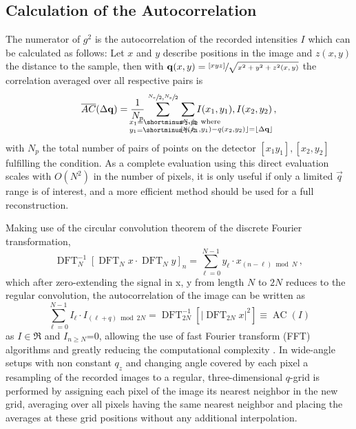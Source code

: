\subsection{Calculation of the Autocorrelation}
\label{sec:corr}
The numerator of $g^2$ is the autocorrelation of the recorded intensities $I$ which can be calculated as follows:
Let $x$ and $y$ describe positions in the image and $z(x,y)$ the distance to the sample, then 
with $\mathbf{q}(x,y) = \sfrac{[x y z]}{\sqrt{x ^ 2 + y ^ 2 + z^2(x,y)}}$  the correlation averaged over all respective pairs is
\begin{equation}
	\overline{AC}(\Delta \vec{q}) = 
	\frac{1}{N_p} \quad \sum^{	\crampedclap{\sfrac{N_x}{2},\sfrac{N_y}{2}}}_{
		\crampedclap{
			\begin{subarray}{l}
				x_1=\shortminus\sfrac{N_x}{2}\\
				y_1=\shortminus\sfrac{N_y}{2}
			\end{subarray}
	}}\quad
	\sum_{\crampedclap{\qquad\qquad\qquad\qquad
			\begin{subarray}{l}
				x_2,y_2 \text{ where} \\ \lfloor q(x_1,y_1)-q(x_2,y_2)\rfloor=\lfloor\Delta\vec{q}\rfloor
	\end{subarray}}}
	I(x_1,y_1),I(x_2,y_2) \,,
	\label{eq:correlation}
\end{equation}
with $N_p$ the total number of pairs of points on the detector $[x_1 y_1],[x_2,y_2]$  fulfilling the condition. As a complete evaluation using this direct evaluation scales with $O(N^2)$ in the number of pixels, it is only useful if only a limited $\vec{q}$ range is of interest, and a more efficient method should be used for a full reconstruction.

Making use of the circular convolution theorem of the discrete Fourier transformation,
\begin{equation}
	\operatorname{DFT}_N^{-1}\left[\operatorname{DFT}_N x \cdot \operatorname{DFT}_N y\right]_n=\sum_{\ell=0}^{N-1} y_{\ell} \cdot x_{(n-\ell) \bmod N} \,,
\end{equation}
which after zero-extending the signal in x, y from length $N$ to $2N$ reduces to the regular convolution, the autocorrelation of the image can be written as 
\begin{equation}
	\sum_{\ell=0}^{N-1} I_{\ell} \cdot I_{(\ell+q) \bmod 2N}=\operatorname{DFT}_{2N}^{-1}\left[\left|\operatorname{DFT}_{2N} {x}\right|^2\right]\equiv \operatorname{AC}(I)
	\label{eq:fftcorrelation}
\end{equation} 
as $I\in \Re$ and $I_{n\geq N}$=0, allowing the use of fast Fourier transform (FFT) algorithms and greatly reducing the computational complexity \cite{oppenheim2009}.  In wide-angle setups with non constant $q_z$ and changing angle covered by each pixel a resampling of the recorded images to a regular, three-dimensional $q$-grid is performed by assigning each pixel of the image its nearest neighbor in the new grid, averaging over all pixels having the same nearest neighbor and placing the averages at these grid positions without any additional interpolation. 

